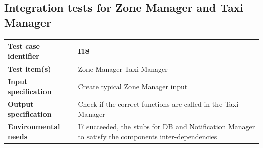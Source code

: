 \documentclass[a4paper,11pt]{report} %
\begin{document}
		\subsection{Integration tests for Zone Manager and Taxi Manager}
			\begin{minipage}{\linewidth}
			\end{minipage}		
		\begin{center}
			\renewcommand{\arraystretch}{1.2}
			\setlength{\tabcolsep}{24pt}
			\begin{tabular}{ l  p{9cm}}\hline
				\textbf{Test case identifier} & I18\\\hline
				\textbf{Test item(s)} & Zone Manager \textrightarrow Taxi Manager\\\hline
				\textbf{Input specification} & Create typical Zone Manager input \\\hline
				\textbf{Output specification} & Check if the correct functions are called in the Taxi Manager\\\hline
				\textbf{Environmental needs} &  I7 succeeded, the stubs for DB and Notification Manager to satisfy the components inter-dependencies\\\hline
			\end{tabular}
		\end{center}
		
\end{document}
